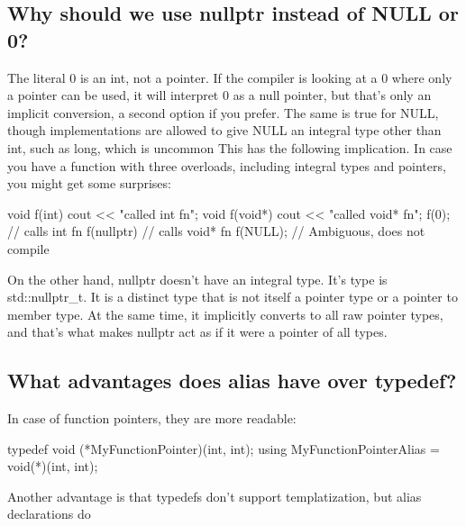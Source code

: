\documentclass{report}
\begin{document}
\subsection{Why should we use nullptr instead of NULL or 0?}
\bigbreak \noindent 
The literal 0 is an int, not a pointer. If the compiler is looking at
a 0 where only a pointer can be used, it will interpret 0 as a null
pointer, but that’s only an implicit conversion, a second option if
\bigbreak \noindent 
you prefer. The same is true for NULL, though implementations are
allowed to give NULL an integral type other than int, such as long,
which is uncommon
\bigbreak \noindent 
This has the following implication. In case you have a function with
three overloads, including integral types and pointers, you might
get some surprises:
\bigbreak \noindent 
\begin{cppcode}
void f(int) { cout << "called int fn"; }
void f(void*) { cout << "called void* fn"; }
f(0); // calls int fn
f(nullptr) // calls void* fn
f(NULL); // Ambiguous, does not compile
\end{cppcode}
\bigbreak \noindent 
On the other hand, nullptr doesn’t have an integral type. It’s type
is std::nullptr\_t. It is a distinct type that is not itself a pointer
type or a pointer to member type. At the same time, it implicitly
converts to all raw pointer types, and that’s what makes nullptr
act as if it were a pointer of all types.

\bigbreak \noindent 
\subsection{What advantages does alias have over typedef?}
\bigbreak \noindent 
In case of function pointers, they are more readable:
\bigbreak \noindent 
\begin{cppcode}
    typedef void (*MyFunctionPointer)(int, int);
    using MyFunctionPointerAlias = void(*)(int, int);
\end{cppcode}
\bigbreak \noindent 
Another advantage is that typedefs don’t support templatization,
but alias declarations do

\bigbreak \noindent 
\end{document}
